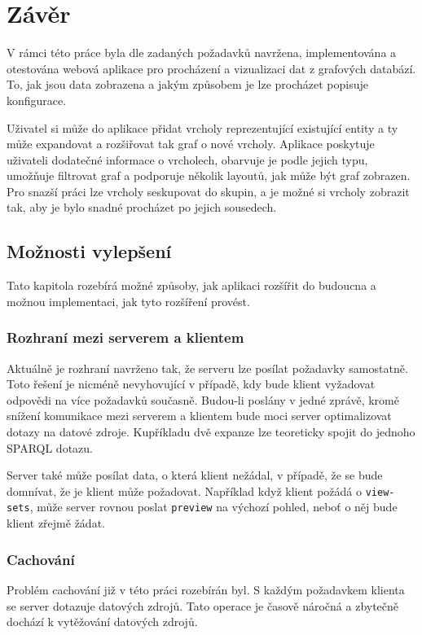 \chapter*{Závěr}
V rámci této práce byla dle zadaných požadavků navržena, implementována a otestována webová aplikace pro procházení a vizualizaci dat z grafových databází. To, jak jsou data zobrazena a jakým způsobem je lze procházet popisuje konfigurace.

Uživatel si může do aplikace přidat vrcholy reprezentující existující entity a ty může expandovat a rozšiřovat tak graf o nové vrcholy. Aplikace poskytuje uživateli dodatečné informace o vrcholech, obarvuje je podle jejich typu, umožňuje filtrovat graf a podporuje několik layoutů, jak může být graf zobrazen. Pro snazší práci lze vrcholy seskupovat do skupin, a je možné si vrcholy zobrazit tak, aby je bylo snadné procházet po jejich sousedech.

\section{Možnosti vylepšení}
Tato kapitola rozebírá možné způsoby, jak aplikaci rozšířit do budoucna a možnou implementaci, jak tyto rozšíření provést.

\subsection*{Rozhraní mezi serverem a klientem}
Aktuálně je rozhraní navrženo tak, že serveru lze posílat požadavky samostatně. Toto řešení je nicméně nevyhovující v případě, kdy bude klient vyžadovat odpovědi na více požadavků současně. Budou-li poslány v jedné zprávě, kromě snížení komunikace mezi serverem a klientem bude moci server optimalizovat dotazy na datové zdroje. Kupříkladu dvě expanze lze teoreticky spojit do jednoho SPARQL dotazu.

Server také může posílat data, o která klient nežádal, v případě, že se bude domnívat, že je klient může požadovat. Například když klient požádá o \texttt{view-sets}, může server rovnou poslat \texttt{preview} na výchozí pohled, neboť o něj bude klient zřejmě žádat.

\subsection*{Cachování}
Problém cachování již v této práci rozebírán byl. S každým požadavkem klienta se server dotazuje datových zdrojů. Tato operace je časově náročná a zbytečně dochází k vytěžování datových zdrojů.

